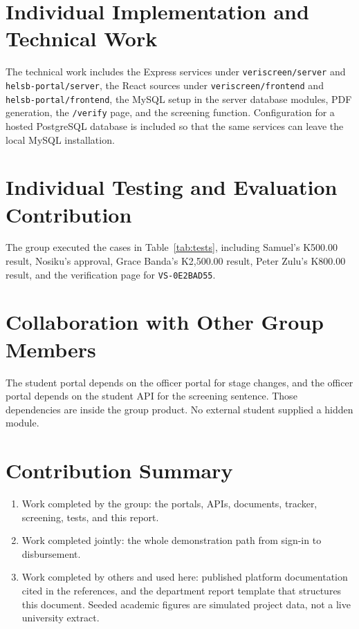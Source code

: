 \documentclass[12pt,a4paper]{report}
\begin{document}
\section{Individual Implementation and Technical Work}
The technical work includes the Express services under \texttt{veriscreen/server} and \texttt{helsb-portal/server}, the React sources under \texttt{veriscreen/frontend} and \texttt{helsb-portal/frontend}, the MySQL setup in the server database modules, PDF generation, the \texttt{/verify} page, and the screening function. Configuration for a hosted PostgreSQL database is included so that the same services can leave the local MySQL installation.

\section{Individual Testing and Evaluation Contribution}
The group executed the cases in Table~\ref{tab:tests}, including Samuel's K500.00 result, Nosiku's approval, Grace Banda's K2,500.00 result, Peter Zulu's K800.00 result, and the verification page for \texttt{VS-0E2BAD55}.

\section{Collaboration with Other Group Members}
The student portal depends on the officer portal for stage changes, and the officer portal depends on the student API for the screening sentence. Those dependencies are inside the group product. No external student supplied a hidden module.

\section{Contribution Summary}
\begin{enumerate}
    \item Work completed by the group: the portals, APIs, documents, tracker, screening, tests, and this report.
    \item Work completed jointly: the whole demonstration path from sign-in to disbursement.
    \item Work completed by others and used here: published platform documentation cited in the references, and the department report template that structures this document. Seeded academic figures are simulated project data, not a live university extract.
\end{enumerate}
\end{document}
